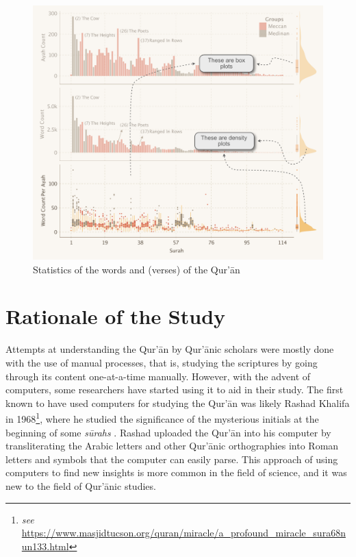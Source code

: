 \begin{figure}[!b]
    \centering
    \includegraphics[width=\textwidth]{img/plot1.pdf}
    \caption{Statistics of the words and   (verses) of the Qur'\=an}
    \label{fig:ayah_word_count}
\end{figure}

\section{Rationale of the Study}\label{sec:rationale}
Attempts at understanding the Qur'\=an by Qur'\=anic scholars were mostly done with the use of manual processes, that is, studying the scriptures by going through its content one-at-a-time manually. However, with the advent of computers, some researchers have started using it to aid in their study. The first known to have used computers for studying the Qur'\=an was likely Rashad Khalifa in 1968\footnote{\textit{see} \url{https://www.masjidtucson.org/quran/miracle/a_profound_miracle_sura68nun133.html}}, where he studied the significance of the mysterious initials at the beginning of some \textit{s\=urahs} . Rashad uploaded the Qur'\=an into his computer by transliterating the Arabic letters and other Qur'\=anic orthographies into Roman letters and symbols that the computer can easily parse. This approach of using computers to find new insights is more common in the field of science, and it was new to the field of Qur'\=anic studies.


